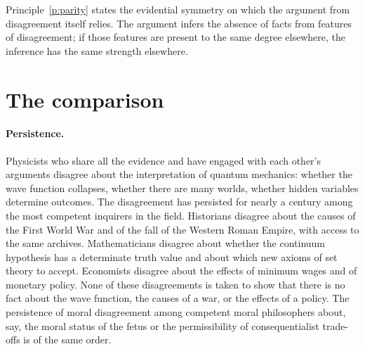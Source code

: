 \documentclass{situationist-preprint}
\begin{document}
Principle~\ref{p:parity} states the evidential symmetry on which the argument from disagreement itself relies. The argument infers the absence of facts from features of disagreement; if those features are present to the same degree elsewhere, the inference has the same strength elsewhere.

\section{The comparison}

\paragraph{Persistence.} Physicists who share all the evidence and have engaged with each other's arguments disagree about the interpretation of quantum mechanics: whether the wave function collapses, whether there are many worlds, whether hidden variables determine outcomes. The disagreement has persisted for nearly a century among the most competent inquirers in the field. Historians disagree about the causes of the First World War and of the fall of the Western Roman Empire, with access to the same archives. Mathematicians disagree about whether the continuum hypothesis has a determinate truth value and about which new axioms of set theory to accept. Economists disagree about the effects of minimum wages and of monetary policy. None of these disagreements is taken to show that there is no fact about the wave function, the causes of a war, or the effects of a policy. The persistence of moral disagreement among competent moral philosophers about, say, the moral status of the fetus or the permissibility of consequentialist trade-offs is of the same order.
\end{document}
